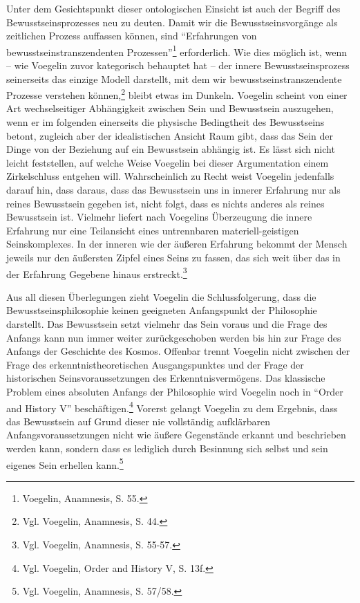 Unter dem Gesichtspunkt dieser ontologischen Einsicht ist auch der Begriff des
Bewusstseinsprozesses neu zu deuten. Damit wir die Bewusstseinsvorgänge als
zeitlichen Prozess auffassen können, sind "`Erfahrungen von
bewusstseinstranszendenten Prozessen"'\footnote{Voegelin, Anamnesis, S. 55.}
erforderlich. Wie dies möglich ist, wenn -- wie Voegelin zuvor kategorisch
behauptet hat -- der innere Bewusstseinsprozess seinerseits das einzige Modell
darstellt, mit dem wir bewusstseinstranszendente Prozesse verstehen
können,\footnote{Vgl. Voegelin, Anamnesis, S. 44.} bleibt etwas im Dunkeln.
Voegelin scheint von einer Art wechselseitiger Abhängigkeit zwischen Sein und
Bewusstsein auszugehen, wenn er im folgenden einerseits die physische
Bedingtheit des Bewusstseins betont, zugleich aber der idealistischen Ansicht
Raum gibt, dass das Sein der Dinge von der Beziehung auf ein Bewusstsein
abhängig ist. Es lässt sich nicht leicht feststellen, auf welche Weise
Voegelin bei dieser Argumentation einem Zirkelschluss entgehen will.
Wahrscheinlich zu Recht weist Voegelin jedenfalls darauf hin, dass daraus,
dass das Bewusstsein uns in innerer Erfahrung nur als reines Bewusstsein
gegeben ist, nicht folgt, dass es nichts anderes als reines Bewusstsein ist.
Vielmehr liefert nach Voegelins Überzeugung die innere Erfahrung nur eine
Teilansicht eines untrennbaren materiell-geistigen Seinskomplexes. In der
inneren wie der äußeren Erfahrung bekommt der Mensch jeweils nur den äußersten
Zipfel eines Seins zu fassen, das sich weit über das in der Erfahrung Gegebene
hinaus erstreckt.\footnote{Vgl.  Voegelin, Anamnesis, S. 55-57.}

Aus all diesen Überlegungen zieht Voegelin die Schlussfolgerung, dass die
Bewusstseinsphilosophie keinen geeigneten Anfangspunkt der Philosophie
darstellt. Das Bewusstsein setzt vielmehr das Sein voraus und die Frage des
Anfangs kann nun immer weiter zurückgeschoben werden bis hin zur Frage des
Anfangs der Geschichte des Kosmos. Offenbar trennt Voegelin nicht zwischen der
Frage des erkenntnistheoretischen Ausgangspunktes und der Frage der
historischen Seinsvoraussetzungen des Erkenntnisvermögens. Das klassische 
Problem eines absoluten Anfangs der Philosophie wird Voegelin noch in "`Order
and History V"' beschäftigen.\footnote{Vgl. Voegelin, Order and History V,
  S. 13f.}  Vorerst gelangt Voegelin zu dem Ergebnis, dass das Bewusstsein auf
Grund dieser nie vollständig aufklärbaren Anfangsvoraussetzungen nicht wie
äußere Gegenstände erkannt und beschrieben werden kann, sondern dass es
lediglich durch Besinnung sich selbst und sein eigenes Sein erhellen
kann.\footnote{Vgl.  Voegelin, Anamnesis, S. 57/58.}

